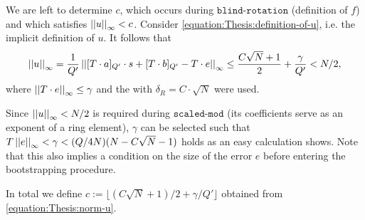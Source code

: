 \documentclass[letterpaper,10pt,english]{jupyterBook}
\begin{document}
\sphinxAtStartPar
We are left to determine \(c\), which occurs during \(\texttt{blind-rotation}\) (definition of \(f\)) and which satisfies \(\left\lvert\left\lvert u \right\rvert\right\rvert_\infty < c\).
Consider \eqref{equation:Thesis:definition-of-u}, i.e. the implicit definition of \(u\).
It follows that
\begin{equation}\label{equation:Thesis:norm-u}
\begin{split}\left\lvert\left\lvert u \right\rvert\right\rvert_\infty = \frac{1}{Q'} \left\lvert\left\lvert [T \cdot a]_{Q'} \cdot s + [T \cdot b]_{Q'} - T \cdot e \right\rvert\right\rvert_\infty \le \frac{C\sqrt{N}+1}{2} + \frac{\gamma}{Q'} < N/2,\end{split}
\end{equation}
\sphinxAtStartPar
where \(\left\lvert\left\lvert T \cdot e \right\rvert\right\rvert_\infty \le \gamma\) and the {\hyperref[\detokenize{Thesis:conclusion-on-delta-r}]{}} with \(\delta_R = C\cdot\sqrt{N}\) were used.

\sphinxAtStartPar
Since \(\left\lvert\left\lvert u \right\rvert\right\rvert_\infty < N/2\) is required during \(\texttt{scaled-mod}\) (its coefficients serve as an exponent of a ring element), \(\gamma\) can be selected such that \(T \left\lvert\left\lvert e \right\rvert\right\rvert_\infty < \gamma < (Q/4N)(N-C\sqrt{N}-1)\) holds as an easy calculation shows.
Note that this also implies a condition on the size of the error \(e\) before entering the bootstrapping procedure.

\sphinxAtStartPar
In total we define \(c := \lfloor (C\sqrt{N}+1)/2 + \gamma/Q' \rfloor\) obtained from \eqref{equation:Thesis:norm-u}.
\end{document}
